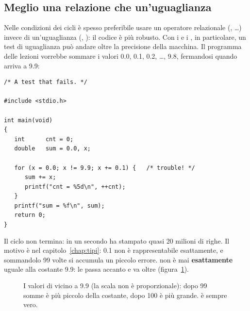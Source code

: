 \subsection{Meglio una relazione che un'uguaglianza}

Nelle condizioni dei cicli è spesso preferibile usare un operatore
relazionale (\code{<}, \code{<=}\dots) invece di un'uguaglianza (\code{==},
\code{!=}): il codice è più robusto. Con i  e i ,
in particolare, un test di uguaglianza può andare oltre la precisione della
macchina. Il programma delle lezioni vorrebbe sommare i valori 0.0, 0.1,
0.2, \dots, 9.8, fermandosi quando  arriva a 9.9:

\begin{affianco}[0.56][c]
\begin{lstlisting}[style=c, name=test.c]
/* A test that fails. */

#include <stdio.h>

int main(void)
{
   int      cnt = 0;
   double   sum = 0.0, x;

   for (x = 0.0; x != 9.9; x += 0.1) {   /* trouble! */
      sum += x;
      printf("cnt = %5d\n", ++cnt);
   }
   printf("sum = %f\n", sum);
   return 0;
}
\end{lstlisting}
\risultato
{}
\end{affianco}

Il ciclo non termina: in un secondo ha stampato quasi 20 milioni di righe.
Il motivo è nel capitolo~\ref{chap:tipi}: 0.1 non è rappresentabile
esattamente, e sommandolo 99 volte si accumula un piccolo errore.  non
è mai \textbf{esattamente} uguale alla costante 9.9: le passa accanto e va
oltre (figura~\ref{fig:nove-nove}).

\begin{figure}[H]
  \centering
  \caption{I valori di  vicino a 9.9 (la scala non è proporzionale):
           dopo 99 somme  è più piccolo della costante, dopo 100 è più
           grande.  è sempre vero.}
  \label{fig:nove-nove}
\end{figure}

